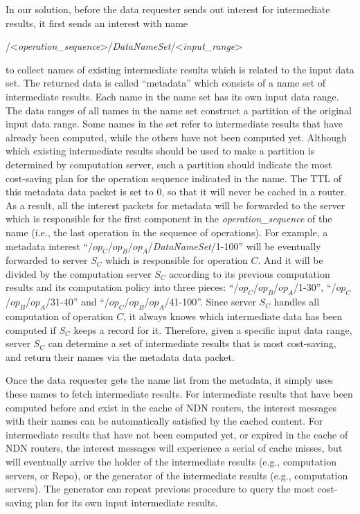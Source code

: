In our solution, before the data requester sends out {\sc interest} for intermediate results, it first sends an {\sc interest} with name 
\begin{center}
/\textless{\it operation\_sequence}\textgreater/{\it DataNameSet}/\textless{\it input\_range}\textgreater
\end{center}
to collect names of existing intermediate results which is related to the input data set.  
The returned {\sc data} is called ``metadata'' which consists of a name set of intermediate results. 
Each name in the name set has its own input data range.
The data ranges of all names in the name set construct a partition of the original input data range.
Some names in the set refer to intermediate results that have already been computed, while the others have not been computed yet.
Although which existing intermediate results should be used to make a partition is determined by computation server,
such a partition should indicate the most cost-saving plan for the operation sequence indicated in the name.  
The TTL of this metadata {\sc data} packet is set to 0, so that it will never be cached in a router.  
As a result, all the {\sc interest} packets for metadata will be forwarded to the server which is responsible for the first component in the {\it operation\_sequence} of the name (i.e., the last operation in the sequence of operations).  
For example, a metadata {\sc interest} ``/$op_C$/$op_B$/$op_A$/{\it DataNameSet}/1-100'' will be eventually forwarded to server $S_C$ which is responsible for operation $C$.  
And it will be divided by the computation server $S_C$ according to its previous computation results and its computation policy into three pieces: ``/$op_C$/$op_B$/$op_A$/1-30'', ``/$op_C$/$op_B$/$op_A$/31-40'' and ``/$op_C$/$op_B$/$op_A$/41-100''. 
Since server $S_C$ handles all computation of operation $C$, it always knows which intermediate data has been computed if $S_C$ keeps a record for it.  
Therefore, given a specific input data range, server $S_C$ can determine a set of intermediate results that is most cost-saving, and return their names via the metadata {\sc data} packet.

Once the data requester gets the name list from the metadata, it simply uses these names to fetch intermediate results.
For intermediate results that have been computed before and exist in the cache of NDN routers, the {\sc interest} messages with their names can be automatically satisfied by the cached content.
For intermediate results that have not been computed yet, or expired in the cache of NDN routers, the {\sc interest} messages will experience a serial of cache misses, but will eventually arrive the holder of the intermediate results (e.g., computation servers, or Repo), or the generator of the intermediate results (e.g., computation servers). 
The generator can repeat previous procedure to query the most cost-saving plan for its own input intermediate results.

